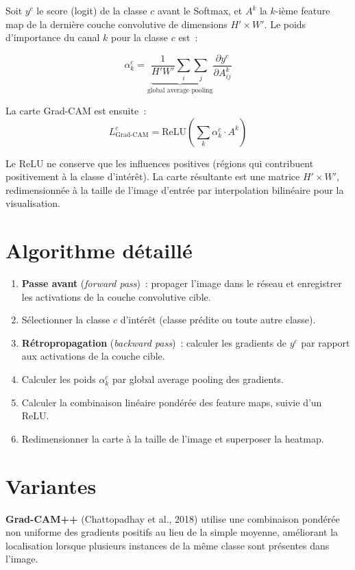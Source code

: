 \documentclass[a4paper,11pt,twoside]{book}
\begin{document}
Soit $y^c$ le score (logit) de la classe $c$ avant le Softmax, et $A^k$ la $k$-ième feature map de la dernière couche convolutive de dimensions $H' \times W'$. Le poids d'importance du canal $k$ pour la classe $c$ est~:

\begin{defbox}
\[
\alpha_k^c = \underbrace{\frac{1}{H' W'} \sum_i \sum_j}_{\text{global average pooling}} \frac{\partial y^c}{\partial A^k_{ij}}
\]
\end{defbox}

La carte Grad-CAM est ensuite~:
\[
L^c_\text{Grad-CAM} = \text{ReLU}\!\left(\sum_k \alpha_k^c \cdot A^k\right)
\]

Le ReLU ne conserve que les influences positives (régions qui contribuent positivement à la classe d'intérêt). La carte résultante est une matrice $H' \times W'$, redimensionnée à la taille de l'image d'entrée par interpolation bilinéaire pour la visualisation.

\section{Algorithme détaillé}

\begin{enumerate}[leftmargin=2em]
  \item \textbf{Passe avant} (\textit{forward pass})~: propager l'image dans le réseau et enregistrer les activations de la couche convolutive cible.
  \item Sélectionner la classe $c$ d'intérêt (classe prédite ou toute autre classe).
  \item \textbf{Rétropropagation} (\textit{backward pass})~: calculer les gradients de $y^c$ par rapport aux activations de la couche cible.
  \item Calculer les poids $\alpha_k^c$ par global average pooling des gradients.
  \item Calculer la combinaison linéaire pondérée des feature maps, suivie d'un ReLU.
  \item Redimensionner la carte à la taille de l'image et superposer la heatmap.
\end{enumerate}

\section{Variantes}

\textbf{Grad-CAM++} (Chattopadhay et al., 2018) utilise une combinaison pondérée non uniforme des gradients positifs au lieu de la simple moyenne, améliorant la localisation lorsque plusieurs instances de la même classe sont présentes dans l'image.
\end{document}
